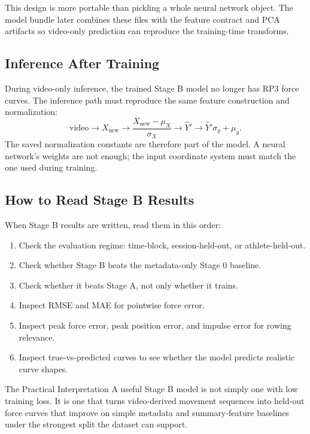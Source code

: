 \documentclass[11pt]{article}
\begin{document}
This design is more portable than pickling a whole neural network object. The
model bundle later combines these files with the feature contract and PCA
artifacts so video-only prediction can reproduce the training-time transforms.

\subsection{Inference After Training}

During video-only inference, the trained Stage B model no longer has RP3 force
curves. The inference path must reproduce the same feature construction and
normalization:
\[
  \text{video}
  \rightarrow
  X_{\text{new}}
  \rightarrow
  \frac{X_{\text{new}}-\mu_X}{\sigma_X}
  \rightarrow
  \hat{Y}'
  \rightarrow
  \hat{Y}'\sigma_y+\mu_y.
\]
The saved normalization constants are therefore part of the model. A neural
network's weights are not enough; the input coordinate system must match the
one used during training.

\subsection{How to Read Stage B Results}

When Stage B results are written, read them in this order:
\begin{enumerate}[leftmargin=*]
  \item Check the evaluation regime: time-block, session-held-out, or
  athlete-held-out.
  \item Check whether Stage B beats the metadata-only Stage 0 baseline.
  \item Check whether it beats Stage A, not only whether it trains.
  \item Inspect RMSE and MAE for pointwise force error.
  \item Inspect peak force error, peak position error, and impulse error for
  rowing relevance.
  \item Inspect true-vs-predicted curves to see whether the model predicts
  realistic curve shapes.
\end{enumerate}

\begin{conceptbox}{The Practical Interpretation}
A useful Stage B model is not simply one with low training loss. It is one that
turns video-derived movement sequences into held-out force curves that improve
on simple metadata and summary-feature baselines under the strongest split the
dataset can support.
\end{conceptbox}
\end{document}
